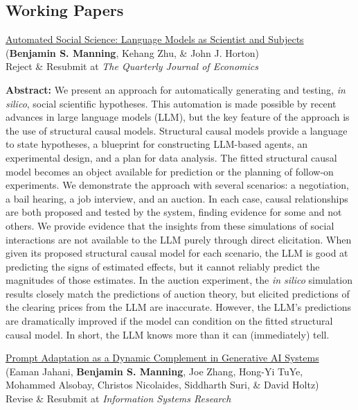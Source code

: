 \documentclass[margin,line,pifont,palatino,courier, 9pt]{res}
\begin{document}
\begin{resume}
\section{\sc Working Papers}

\href{https://www.nber.org/papers/w32381}{Automated Social Science: Language Models as Scientist and Subjects}\\
(\textbf{Benjamin S. Manning}\footnotemark[\value{footnote}], Kehang Zhu\footnotemark[\value{footnote}], \& John J. Horton)\\
Reject \& Resubmit at \textit{The Quarterly Journal of Economics}

\begin{singlespace}
\footnotesize
\textbf{Abstract: }We present an approach for automatically generating and testing, \emph{in silico}, social scientific hypotheses.
This automation is made possible by recent advances in large language models (LLM), but the key feature of the approach is the use of structural causal models. 
Structural causal models provide a language to state hypotheses, a blueprint for constructing LLM-based agents, an experimental design, and a plan for data analysis.
The fitted structural causal model becomes an object available for prediction or the planning of follow-on experiments.
We demonstrate the approach with several scenarios: a negotiation, a bail hearing, a job interview, and an auction.
In each case, causal relationships are both proposed and tested by the system, finding evidence for some and not others.
We provide evidence that the insights from these simulations of social interactions are not available to the LLM purely through direct elicitation.
When given its proposed structural causal model for each scenario, the LLM is good at predicting the signs of estimated effects, but it cannot reliably predict the magnitudes of those estimates.
In the auction experiment, the \emph{in silico} simulation results closely match the predictions of auction theory, but elicited predictions of the clearing prices from the LLM are inaccurate.
However, the LLM's predictions are dramatically improved if the model can condition on the fitted structural causal model.
In short, the LLM knows more than it can (immediately) tell. 
\end{singlespace}

\href{https://arxiv.org/abs/2407.14333}{Prompt Adaptation as a Dynamic Complement in Generative AI Systems}\\
(Eaman Jahani\footnotemark[\value{footnote}], \textbf{Benjamin S. Manning}\footnotemark[\value{footnote}], Joe Zhang\footnotemark[\value{footnote}], Hong-Yi TuYe, Mohammed Alsobay, Christos Nicolaides, Siddharth Suri, \& David Holtz\footnotemark[\value{footnote}])\\
Revise \& Resubmit at \textit{Information Systems Research}


\end{resume}
\end{document}
